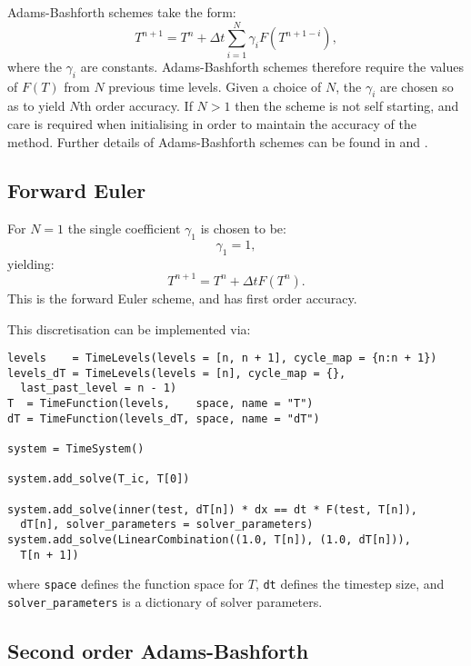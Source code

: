 \documentclass[a4paper]{book}
\begin{document}
Adams-Bashforth schemes take the form:
\begin{equation}
  T^{n + 1} = T^n + \Delta t \sum_{i = 1}^N \gamma_i F( T^{n + 1 - i}),
\end{equation}
where the $\gamma_i$ are constants. Adams-Bashforth schemes therefore require
the values of $F(T)$ from $N$ previous time levels. Given a choice of $N$, the
$\gamma_i$ are chosen so as to yield $N$th order accuracy. If $N > 1$ then the
scheme is not self starting, and care is required when initialising in order to
maintain the accuracy of the method. Further details of Adams-Bashforth schemes
can be found in \citet[section 2.1]{iserles2009} and
\citet[section III.1]{hairer1987}.

\subsection{Forward Euler}\label{sect:fe}

For $N = 1$ the single coefficient $\gamma_1$ is chosen to be:
\begin{equation}
  \gamma_1 = 1,
\end{equation}
yielding:
\begin{equation}
  T^{n + 1} = T^n + \Delta t F(T^n).
\end{equation}
This is the forward Euler scheme, and has first order accuracy.

This discretisation can be implemented via:
\begin{lstlisting}
levels    = TimeLevels(levels = [n, n + 1], cycle_map = {n:n + 1})
levels_dT = TimeLevels(levels = [n], cycle_map = {},
  last_past_level = n - 1)
T  = TimeFunction(levels,    space, name = "T")
dT = TimeFunction(levels_dT, space, name = "dT")

system = TimeSystem()

system.add_solve(T_ic, T[0])

system.add_solve(inner(test, dT[n]) * dx == dt * F(test, T[n]),
  dT[n], solver_parameters = solver_parameters)
system.add_solve(LinearCombination((1.0, T[n]), (1.0, dT[n])),
  T[n + 1])
\end{lstlisting}
where \verb+space+ defines the function space for $T$, \verb+dt+ defines the
timestep size, and \verb+solver_parameters+ is a dictionary of solver
parameters.

\subsection{Second order Adams-Bashforth}\label{sect:ab2}
\end{document}
